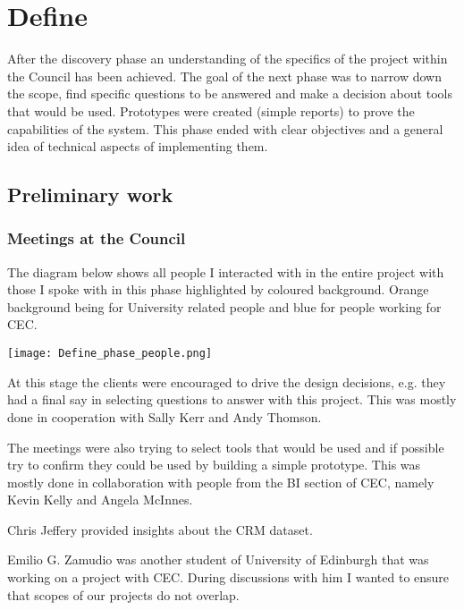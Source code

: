 	\section{Define}
	
After the discovery phase an understanding of the specifics of the project within the Council has been achieved. The goal of the next phase was to narrow down the scope, find specific questions to be answered and make a decision about tools that would be used. Prototypes were created (simple reports) to prove the capabilities of the system. This phase ended with clear objectives and a general idea of technical aspects of implementing them.	
	
		\subsection{Preliminary work}
		
			\subsubsection{Meetings at the Council}
			
The diagram below shows all people I interacted with in the entire project with those I spoke with in this phase highlighted by coloured background. Orange background being for University related people and blue for people working for CEC.


\begin{center}
  \texttt{[image: Define\_phase\_people.png]}
  \label{normal_case}
\end{center}


At this stage the clients were encouraged to drive the design decisions, e.g. they had a final say in selecting questions to answer with this project. This was mostly done in cooperation with Sally Kerr and Andy Thomson.

The meetings were also trying to select tools that would be used and if possible try to confirm they could be used by building a simple prototype. This was mostly done in collaboration with people from the BI section of CEC, namely Kevin Kelly and Angela McInnes.

Chris Jeffery provided insights about the CRM dataset.

Emilio G. Zamudio was another student of University of Edinburgh that was working on a project with CEC. During discussions with him I wanted to ensure that scopes of our projects do not overlap.
